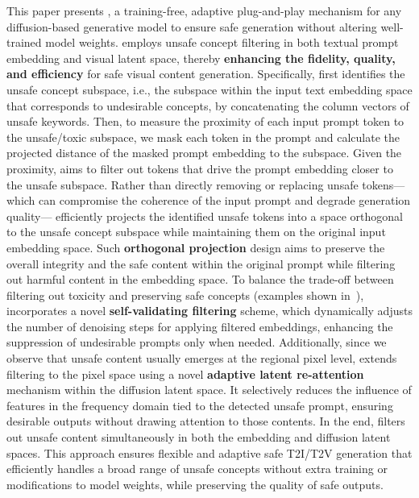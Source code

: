 This paper presents \ours{}, a training-free, adaptive plug-and-play mechanism for any diffusion-based generative model to ensure safe generation without altering well-trained model weights.
\ours{} employs unsafe concept filtering in both textual prompt embedding and visual latent space, thereby \textbf{enhancing the fidelity, quality, and efficiency} for safe visual content generation. Specifically, \ours{} first identifies the unsafe concept subspace, i.e., the subspace within the input text embedding space that corresponds to undesirable concepts, by concatenating the column vectors of unsafe keywords. 
Then, to measure the proximity of each input prompt token to the unsafe/toxic subspace, we mask each token in the prompt and calculate the projected distance of the masked prompt embedding to the subspace. Given the proximity, \ours{} aims to filter out tokens that drive the prompt embedding closer to the unsafe subspace. Rather than directly removing or replacing unsafe tokens—which can compromise the coherence of the input prompt and degrade generation quality—\ours{} efficiently projects the identified unsafe tokens into a space orthogonal to the unsafe concept subspace while maintaining them on the original input embedding space.
Such \textbf{orthogonal projection} design aims to preserve the overall integrity and the safe content within the original prompt while filtering out harmful content in the embedding space. 
To balance the trade-off between filtering out toxicity and preserving safe concepts (examples shown in~), \ours{} incorporates a novel \textbf{self-validating filtering} scheme, which dynamically adjusts the number of denoising steps for applying filtered embeddings, enhancing the suppression of undesirable prompts only when needed.
Additionally, since we observe that unsafe content usually emerges at the regional pixel level, \ours{} extends filtering to the pixel space using a novel \textbf{adaptive latent re-attention} mechanism within the diffusion latent space. 
It selectively reduces the influence of features in the frequency domain tied to the detected unsafe prompt, ensuring desirable outputs without drawing attention to those contents.
In the end, \ours{} filters out unsafe content simultaneously in both the embedding and diffusion latent spaces. 
This approach ensures flexible and adaptive safe T2I/T2V generation that efficiently handles a broad range of unsafe concepts without extra training or modifications to model weights, 
while preserving the quality of safe outputs.

